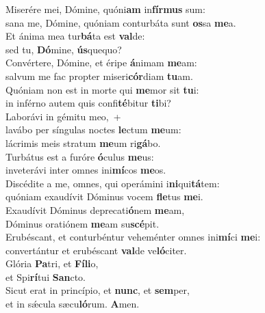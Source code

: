 \evenverse Miserére mei, Dómine, quóni\textbf{am} in\textbf{fír}\textbf{mus} sum:~\*\\
\evenverse sana me, Dómine, quóniam conturbáta sunt \textbf{os}sa \textbf{me}a.\\
\oddverse Et ánima mea tur\textbf{bá}ta est \textbf{val}de:~\*\\
\oddverse sed tu, \textbf{Dó}mine, \textbf{ús}quequo?\\
\evenverse Convértere, Dómine, et éripe \textbf{á}nimam \textbf{me}am:~\*\\
\evenverse salvum me fac propter miseri\textbf{cór}diam \textbf{tu}am.\\
\oddverse Quóniam non est in morte qui \textbf{me}mor sit \textbf{tu}i:~\*\\
\oddverse in inférno autem quis confi\textbf{té}bitur \textbf{ti}bi?\\
\evenverse Laborávi in gémitu meo,~+\\
\evenverse  lavábo per síngulas noctes \textbf{le}ctum \textbf{me}um:~\*\\
\evenverse lácrimis meis stratum \textbf{me}um ri\textbf{gá}bo.\\
\oddverse Turbátus est a furóre \textbf{ó}culus \textbf{me}us:~\*\\
\oddverse inveterávi inter omnes ini\textbf{mí}cos \textbf{me}os.\\
\evenverse Discédite a me, omnes, qui operámini i\textbf{ni}qui\textbf{tá}tem:~\*\\
\evenverse quóniam exaudívit Dóminus vocem \textbf{fle}tus \textbf{me}i.\\
\oddverse Exaudívit Dóminus deprecati\textbf{ó}nem \textbf{me}am,~\*\\
\oddverse Dóminus oratiónem \textbf{me}am su\textbf{scé}pit.\\
\evenverse Erubéscant, et conturbéntur veheménter omnes ini\textbf{mí}ci \textbf{me}i:~\*\\
\evenverse convertántur et erubéscant \textbf{val}de ve\textbf{ló}citer.\\
\oddverse Glória \textbf{Pa}tri, et \textbf{Fí}\textbf{li}o,~\*\\
\oddverse et Spi\textbf{rí}tui \textbf{San}cto.\\
\evenverse Sicut erat in princípio, et \textbf{nunc}, et \textbf{sem}per,~\*\\
\evenverse et in sǽcula sæcu\textbf{ló}rum. \textbf{A}men.\\
